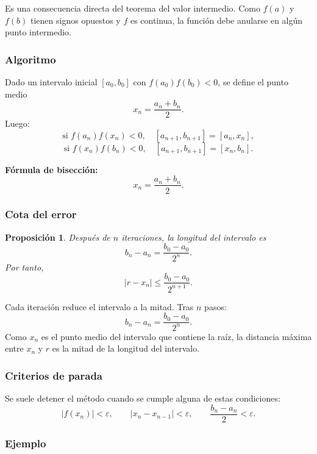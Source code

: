 \documentclass[a4paper,12pt]{article}
\newcommand{\eps}{\varepsilon}
\theoremstyle{definition}
\theoremstyle{plain}
\newtheorem{proposicion}{Proposición}[section]
\begin{document}
\begin{demostracion}
Es una consecuencia directa del teorema del valor intermedio. Como $f(a)$ y
$f(b)$ tienen signos opuestos y $f$ es continua, la función debe anularse en
algún punto intermedio.
\end{demostracion}

\subsubsection{Algoritmo}

Dado un intervalo inicial $[a_0,b_0]$ con $f(a_0)f(b_0)<0$, se define el
punto medio
\[
x_n=\frac{a_n+b_n}{2}.
\]
Luego:
\[
\text{si } f(a_n)f(x_n)<0,\quad [a_{n+1},b_{n+1}]=[a_n,x_n],
\]
\[
\text{si } f(x_n)f(b_n)<0,\quad [a_{n+1},b_{n+1}]=[x_n,b_n].
\]

\begin{cajaresultado}
\textbf{Fórmula de bisección:}
\[
x_n=\frac{a_n+b_n}{2}.
\]
\end{cajaresultado}

\subsubsection{Cota del error}

\begin{proposicion}
Después de $n$ iteraciones, la longitud del intervalo es
\[
b_n-a_n=\frac{b_0-a_0}{2^n}.
\]
Por tanto,
\[
|r-x_n|\le \frac{b_0-a_0}{2^{n+1}}.
\]
\end{proposicion}

\begin{demostracion}
Cada iteración reduce el intervalo a la mitad. Tras $n$ pasos:
\[
b_n-a_n=\frac{b_0-a_0}{2^n}.
\]
Como $x_n$ es el punto medio del intervalo que contiene la raíz, la distancia
máxima entre $x_n$ y $r$ es la mitad de la longitud del intervalo.
\end{demostracion}

\subsubsection{Criterios de parada}

Se suele detener el método cuando se cumple alguna de estas condiciones:
\[
|f(x_n)|<\eps, \qquad |x_n-x_{n-1}|<\eps, \qquad \frac{b_n-a_n}{2}<\eps.
\]

\subsubsection{Ejemplo}
\end{document}
